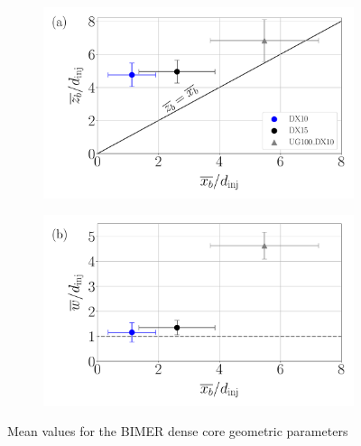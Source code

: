 \begin{figure}[ht]
\flushleft
\begin{subfigure}[b]{0.45\textwidth}
	\centering
   \includegraphics[scale=0.25]{./part3_applications/figures_ch8_resolved/results_dense_core_modeling/map_xb_zb}
   \label{fig:BIMER_dense_core_mean_parameters_scatterplots_zb_xb}
\end{subfigure}
\hspace{0.25in}
\begin{subfigure}[b]{0.45\textwidth}
	\centering
   \includegraphics[scale=0.25]{./part3_applications/figures_ch8_resolved/results_dense_core_modeling/map_xb_width}
   \label{fig:BIMER_dense_core_mean_parameters_scatterplots_w_xb}
\end{subfigure}
   \vspace*{-0.30in}
\caption{Mean values for the BIMER dense core geometric parameters}
\label{fig:BIMER_DC_mean_parameters_scatterplots}
\end{figure}



